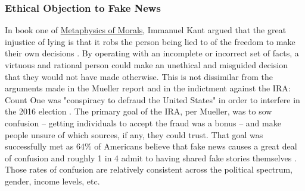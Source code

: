 \documentclass[preprint,review,12pt]{elsarticle}
\begin{document}
\subsubsection{Ethical Objection to Fake News}
In book one of \underline{Metaphysics of Morals}, Immanuel Kant argued that the great injustice of lying is that it robs the person being lied to of the freedom to make their own decisions \cite{kant1996metaphysics}. By operating with an incomplete or incorrect set of facts, a virtuous and rational person could make an unethical and misguided decision that they would not have made otherwise. This is not dissimilar from the arguments made in the Mueller report and in the indictment against the IRA: Count One was "conspiracy to defraud the United States" in order to interfere in the 2016 election  \cite{mueller2019mueller,mueller2020internet}. The primary goal of the IRA, per Mueller, was to sow confusion -- getting individuals to accept the fraud was a bonus -- and make people unsure of which sources, if any, they could trust. That goal was successfully met as 64\% of Americans believe that fake news causes a great deal of confusion and roughly 1 in 4 admit to having shared fake stories themselves \cite{barthel2016americans}. Those rates of confusion are relatively consistent across the political spectrum, gender, income levels, etc. 
\end{document}
